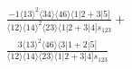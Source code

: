 \documentclass[varwidth, border=5pt]{standalone}
\begin{document}
\begin{my}
$\begin{gathered}
\scriptscriptstyle\frac{-1⟨13⟩^2⟨34⟩⟨46⟩⟨1|2+3|5]}{⟨12⟩⟨14⟩^2⟨23⟩⟨1|2+3|4]s_{123}}+\\
\scriptscriptstyle\frac{3⟨13⟩^2⟨46⟩⟨3|1+2|5]}{⟨12⟩⟨14⟩⟨23⟩⟨1|2+3|4]s_{123}}\phantom{+}
\end{gathered}$
\end{my}
\end{document}
